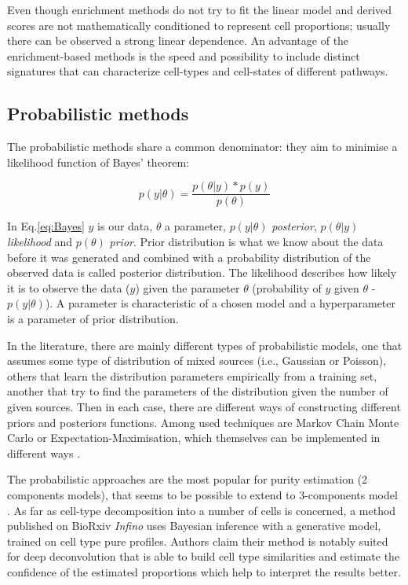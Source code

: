 \documentclass[12pt,]{book}
\theoremstyle{definition}
\theoremstyle{definition}
\theoremstyle{definition}
\theoremstyle{remark}
\begin{document}
Even though enrichment methods do not try to fit the linear model and
derived scores are not mathematically conditioned to represent cell
proportions; usually there can be observed a strong linear dependence.
An advantage of the enrichment-based methods is the speed and
possibility to include distinct signatures that can characterize
cell-types and cell-states of different pathways.

\hypertarget{probabilistic-methods}{%
\subsection{Probabilistic methods}\label{probabilistic-methods}}

The probabilistic methods share a common denominator: they aim to
minimise a likelihood function of Bayes' theorem:

\begin{equation}
p(y|\theta) = \frac{p(\theta|y )* p(y)}{p(\theta)} \label{eq:Bayes}
\end{equation}

In Eq.\eqref{eq:Bayes} \(y\) is our data, \(\theta\) a parameter,
\(p(y|\theta)\) \emph{posterior}, \(p(\theta|y )\) \emph{likelihood} and
\(p(\theta)\) \emph{prior}. Prior distribution is what we know about the
data before it was generated and combined with a probability
distribution of the observed data is called posterior distribution. The
likelihood describes how likely it is to observe the data (\(y\)) given
the parameter \(\theta\) (probability of \(y\) given \(\theta\) -
\(p(y|\theta)\)). A parameter is characteristic of a chosen model and a
hyperparameter is a parameter of prior distribution.

In the literature, there are mainly different types of probabilistic
models, one that assumes some type of distribution of mixed sources
(i.e., Gaussian or Poisson), others that learn the distribution
parameters empirically from a training set, another that try to find the
parameters of the distribution given the number of given sources. Then
in each case, there are different ways of constructing different priors
and posteriors functions. Among used techniques are Markov Chain Monte
Carlo or Expectation-Maximisation, which themselves can be implemented
in different ways
\citep[\citet{Zaslavsky2017}]{Erkkila2010, Ghosh2004, Lahdesmaki2005, Li2013, Roy2006}.

The probabilistic approaches are the most popular for purity estimation
(2 components models), that seems to be possible to extend to
3-components model \citep{Wang2017}. As far as cell-type decomposition
into a number of cells is concerned, a method published on BioRxiv
\emph{Infino} uses Bayesian inference with a generative model, trained
on cell type pure profiles. Authors claim their method is notably suited
for deep deconvolution that is able to build cell type similarities and
estimate the confidence of the estimated proportions which help to
interpret the results better.
\end{document}

